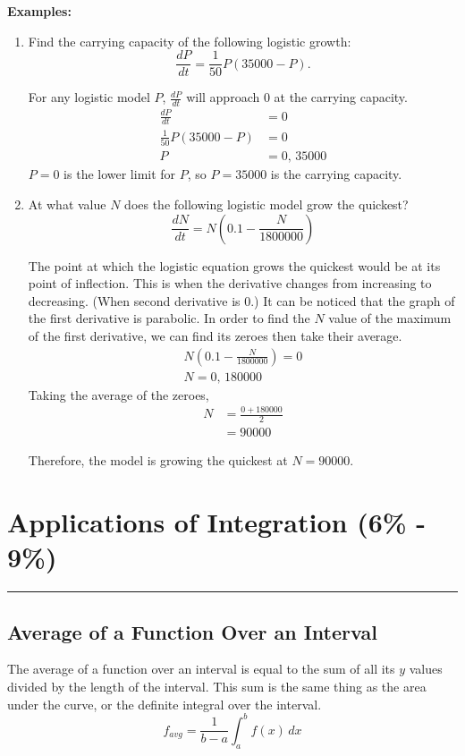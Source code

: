 \documentclass[12pt]{article}
\newcommand{\fline}{\par\noindent\rule{\textwidth}{0.1pt}} %
\begin{document}
\noindent \textbf{Examples:}
\begin{enumerate}
	\item Find the carrying capacity of the following logistic growth:
	      \[ \frac{dP}{dt} = \frac{1}{50} P (35000 - P). \]

	      For any logistic model $P$, $\frac{dP}{dt}$ will approach $0$ at the carrying capacity.
	      \begin{align*}
		      \frac{dP}{dt}              & = 0           \\[6pt]
		      \frac{1}{50} P (35000 - P) & = 0           \\[6pt]
		      P                          & = 0, \, 35000
	      \end{align*}
	      $P=0$ is the lower limit for $P$, so $P=35000$ is the carrying capacity.
	      \bigskip

	\item At what value $N$ does the following logistic model grow the quickest?
	      \[ \frac{dN}{dt} = N \left( 0.1 - \frac{N}{1800000} \right) \]

	      The point at which the logistic equation grows the quickest would be at its point of inflection. This is when the derivative changes from increasing to decreasing. (When second derivative is $0$.) It can be noticed that the graph of the first derivative is parabolic. In order to find the $N$ value of the maximum of the first derivative, we can find its zeroes then take their average.
	      \begin{gather*}
		      N \left( 0.1 - \frac{N}{1800000} \right) = 0 \\[6pt]
		      N = 0, \, 180000
	      \end{gather*}
	      Taking the average of the zeroes,
	      \begin{align*}
		      N & = \frac{0 + 180000}{2} \\[6pt]
		      & = 90000
	      \end{align*}

	      Therefore, the model is growing the quickest at $N=90000$.
\end{enumerate}

\section{Applications of Integration (6\% - 9\%)}
\fline

\subsection{Average of a Function Over an Interval} %
The average of a function over an interval is equal to the sum of all its $y$ values divided by the length of the interval. This sum is the same thing as the area under the curve, or the definite integral over the interval.
\[ f_{avg} = \frac{1}{b-a} \int_{a}^{b} f(x) \, dx \]
\end{document}
